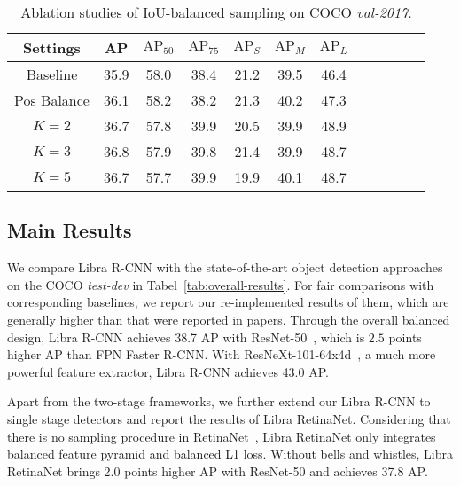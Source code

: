 \documentclass[10pt,twocolumn,letterpaper]{article}
\begin{document}
\begin{table}[htb]
	\centering
	\caption{Ablation studies of IoU-balanced sampling on COCO \emph{val-2017}.}
	\vspace{-5pt}
	\addtolength{\tabcolsep}{-2pt}
	\begin{tabular}{*{12}{c}}
		\toprule
		Settings    & AP   & $\text{AP}_{50}$ & $\text{AP}_{75}$ & $\text{AP}_{S}$ & $\text{AP}_{M}$ & $\text{AP}_{L}$ \\
		\midrule
		Baseline    & 35.9 & 58.0             & 38.4             & 21.2            & 39.5            & 46.4            \\
		\midrule
		Pos Balance & 36.1 & 58.2             & 38.2             & 21.3            & 40.2            & 47.3            \\
		$K = 2$     & 36.7 & 57.8             & 39.9             & 20.5            & 39.9            & 48.9            \\
		$K = 3$     & 36.8 & 57.9             & 39.8             & 21.4            & 39.9            & 48.7            \\
		$K = 5$     & 36.7 & 57.7             & 39.9             & 19.9            & 40.1            & 48.7            \\
		\bottomrule
	\end{tabular}
	\vspace{-10pt}
	\label{tab:iou}
\end{table}

\subsection{Main Results}
We compare Libra R-CNN with the state-of-the-art object detection approaches on the COCO \emph{test-dev} in Tabel~\ref{tab:overall-results}.
For fair comparisons with corresponding baselines, we report our re-implemented results of them, which are generally higher than that were reported in papers.
Through the overall balanced design, Libra R-CNN achieves 38.7 AP with ResNet-50~\cite{resnet}, which is $2.5$ points higher AP than FPN Faster R-CNN.
With ResNeXt-101-64x4d~\cite{resnext}, a much more powerful feature extractor, Libra R-CNN achieves 43.0 AP.

Apart from the two-stage frameworks, we further extend our Libra R-CNN to single stage detectors and report the results of Libra RetinaNet.
Considering that there is no sampling procedure in RetinaNet~\cite{focalloss}, Libra RetinaNet only integrates balanced feature pyramid and balanced L1 loss.
Without bells and whistles, Libra RetinaNet brings 2.0 points higher AP with ResNet-50 and achieves 37.8 AP.
\end{document}
